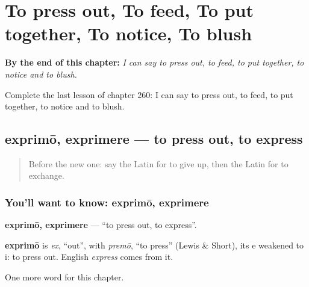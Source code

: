 
\chapter{To press out, To feed, To put together, To notice, To blush}
\label{ch:la-to-press-out-to-feed-to-put-together-to-notice-to-blush}

\begin{chapteropening}
\textbf{By the end of this chapter:} \emph{I can say to press out, to feed, to put together, to notice and to blush.}

Complete the last lesson of chapter 260: I can say to press out, to feed, to put together, to notice and to blush.
\end{chapteropening}

\section[exprimō, exprimere]{exprimō, exprimere — to press out, to express}

\label{lesson:LA-C260-exprimo}



\begin{quote}
Before the new one: say the Latin for to give up, then the Latin for to exchange.
\end{quote}

\subsection*{You'll want to know: exprimō, exprimere}
\textbf{exprimō, exprimere} — \textquotedblleft{}to press out, to express\textquotedblright{}.

\begin{cousinweb}
\textbf{exprimō} is \emph{ex}, \textquotedblleft{}out\textquotedblright{}, with \emph{premō}, \textquotedblleft{}to press\textquotedblright{} (Lewis \& Short), its e weakened to i: to press out. English \emph{express} comes from it.
\end{cousinweb}

\begin{grammarlens}[title={What you've built}]
One more word for this chapter.
\end{grammarlens}

